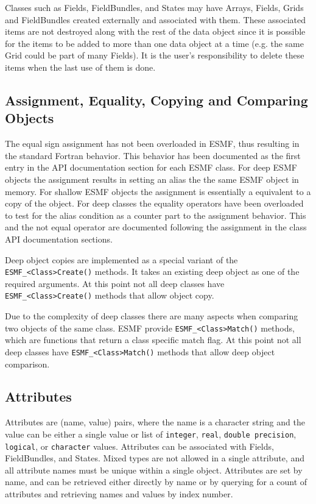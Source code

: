 Classes such as Fields, FieldBundles, and States may have Arrays, 
Fields, Grids and FieldBundles created externally and associated with
them.  These associated items are not destroyed along with the rest  
of the data object since it is possible for the items to be added 
to more than one data object at a time (e.g. the same Grid could 
be part of many Fields).  It is the user's responsibility to delete 
these items when the last use of them is done.

\subsection{Assignment, Equality, Copying and Comparing Objects}

The equal sign assignment has not been overloaded in ESMF, thus resulting in
the standard Fortran behavior. This behavior has been documented as the first
entry in the API documentation section for each ESMF class. For deep ESMF
objects the assignment results in setting an alias the the same ESMF object
in memory. For shallow ESMF objects the assignment is essentially a equivalent
to a copy of the object. For deep classes the equality operators have been
overloaded to test for the alias condition as a counter part to the assignment
behavior. This and the not equal operator are documented following the
assignment in the class API documentation sections. 

\begin{sloppypar}
Deep object copies are implemented as a special variant of the
{\tt ESMF\_<Class>Create()} methods. It takes an existing deep object as
one of the required arguments. At this point not all deep classes have
{\tt ESMF\_<Class>Create()} methods that allow object copy.
\end{sloppypar}

Due to the complexity of deep classes there are many aspects when comparing two
objects of the same class. ESMF provide {\tt ESMF\_<Class>Match()} methods,
which are functions that return a class specific match flag. At this point not
all deep classes have {\tt ESMF\_<Class>Match()} methods that allow deep object
comparison.

\subsection{Attributes}

Attributes are (name, value) pairs, where
the name is a character string and the value can be either a single
value or list of {\tt integer}, {\tt real}, {\tt double precision},
{\tt logical}, or {\tt character} values.
Attributes can be associated with Fields, FieldBundles, and States. 
Mixed types are not allowed in a single attribute, and all attribute
names must be unique within a single object.    Attributes are set
by name, and can be retrieved either directly by name or by querying
for a count of attributes and retrieving names and values
by index number.

